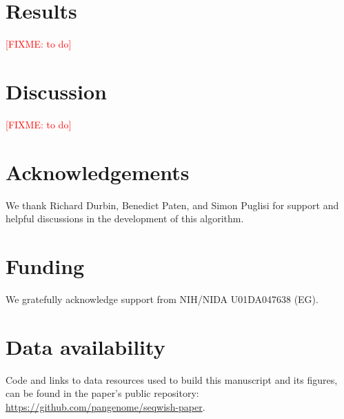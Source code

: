 \documentclass{bioinfo}
\theoremstyle{definition}
\newcommand{\red}[1]{{\textcolor{Red}{#1}}}
\newcommand{\FIXME}[1]{\red{[FIXME: #1]}}
\begin{document}
    \section{Results}
    \label{sec:results}
    \FIXME{to do}




    \section{Discussion}
    \label{sec:discussion}
    \FIXME{to do}

    \section*{Acknowledgements}

    We thank Richard Durbin, Benedict Paten, and Simon Puglisi for support and helpful discussions in the development of this algorithm.

    \section*{Funding}

    We gratefully acknowledge support from NIH/NIDA U01DA047638 (EG).

    \section*{Data availability}

    Code and links to data resources used to build this manuscript and its figures, can be found in the paper's public repository: \url{https://github.com/pangenome/seqwish-paper}.

    

    
\end{document}
